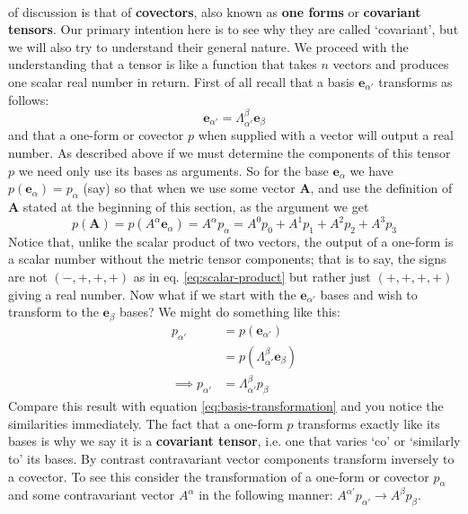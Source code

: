 \documentclass[english,seminar]{lecture}
\begin{document}
\\ of discussion is that of \textbf{covectors}, also known as \textbf{one forms} or \textbf{covariant tensors}. Our primary intention here is to see why they are called `covariant', but we will also try to understand their general nature. We proceed with the understanding that a tensor is like a function that takes $n$ vectors and produces one scalar real number in return. First of all recall that a basis $\mathbf{e}_{\alpha '}$ transforms as follows:
\begin{equation}
	\mathbf{e}_{\alpha '} = \Lambda^\beta_{\alpha '} \mathbf{e}_\beta \label{eq:basis-transformation}
\end{equation}%
and that a one-form or covector $p$ when supplied with a vector will output a real number. As described above if we must determine the components of this tensor $p$ we need only use its bases as arguments. So for the base $\mathbf{e}_\alpha$ we have $p(\mathbf{e}_\alpha) = p_\alpha$ (say) so that when we use some vector $\mathbf{A}$, and use the definition of $\mathbf{A}$ stated at the beginning of this section, as the argument we get
$$ p(\mathbf{A}) = p(A^\alpha\mathbf{e}_\alpha) =	 A^\alpha p_\alpha = A^0p_0 + A^1p_1 + A^2p_2 + A^3p_3 $$
Notice that, unlike the scalar product of two vectors, the output of a one-form is a scalar number without the metric tensor components; that is to say, the signs are not $(-,+,+,+)$ as in eq. \eqref{eq:scalar-product} but rather just $(+,+,+,+)$ giving a real number. Now what if we start with the $\mathbf{e}_{\alpha '}$ bases and wish to transform to the $\mathbf{e}_{\beta}$ bases? We might do something like this:
\begin{align*}
	p_{\alpha '} &= p(\mathbf{e}_{\alpha '}) \\
				&= p(\Lambda^\beta_{\alpha '} \mathbf{e}_\beta) \\
\implies p_{\alpha '} &= \Lambda^\beta_{\alpha '} p_\beta
\end{align*}%
Compare this result with equation \eqref{eq:basis-transformation} and you notice the similarities immediately. The fact that a one-form $p$ transforms exactly like its bases is why we say it is a \textbf{covariant tensor}, i.e. one that varies `co' or `similarly to' its bases. By contrast contravariant vector components transform inversely to a covector. To see this consider the transformation of a one-form or covector $p_\alpha$ and some contravariant vector $A^\alpha$ in the following manner: $A^{\alpha '}p_{\alpha '} \rightarrow A^\beta p_\beta$.
\end{document}
